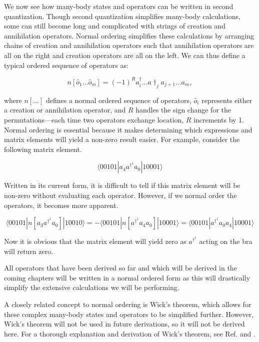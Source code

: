 We now see how many-body states and operators can be written in second quantization. Though second quantization simplifies many-body calculations, some can still become long and complicated with strings of creation and annihilation operators. Normal ordering simplifies these calculations by arranging chains of creation and annihilation operators such that annihilation operators are all on the right and creation operators are all on the left. We can thus define a typical ordered sequence of operators as:

\begin{equation}
    n[\hat{o}_1 ... \hat{o}_m ] = (-1)^R a^\dagger_{i}...a\dagger_ja_{j+1}...a_m,
\end{equation}

where $n[...]$ defines a normal ordered sequence of operators, $\hat{o}_i$ represents either a creation or annihilation operator, and $R$ handles the sign change for the permutations—each time two operators exchange location, $R$ increments by 1. Normal ordering is essential because it makes determining which expressions and matrix elements will yield a non-zero result easier. For example, consider the following matrix element.

\begin{equation}
    \langle 00101|a_4a^{\dagger^1}a_0|10001\rangle
\end{equation}

Written in its current form, it is difficult to tell if this matrix element will be non-zero without evaluating each operator. However, if we normal order the operators, it becomes more apparent.

\begin{equation}
    \langle 00101|n[a_3a^{\dagger^1}a_0]|10010\rangle = -\langle 00101|n[a^{\dagger^1}a_4a_0]|10001\rangle = \langle 00101|a^{\dagger^1}a_0a_4|10001\rangle
\end{equation}

Now it is obvious that the matrix element will yield zero as $a^{\dagger^1}$ acting on the bra will return zero.

All operators that have been derived so far and which will be derived in the coming chapters will be written in a normal ordered form as this will drastically simplify the extensive calculations we will be performing.  

A closely related concept to normal ordering is Wick's theorem, which allows for these complex many-body states and operators to be simplified further. However, Wick's theorem will not be used in future derivations, so it will not be derived here. For a thorough explanation and derivation of Wick's theorem, see Ref. \cite{Ref12} and \cite{Ref21}.